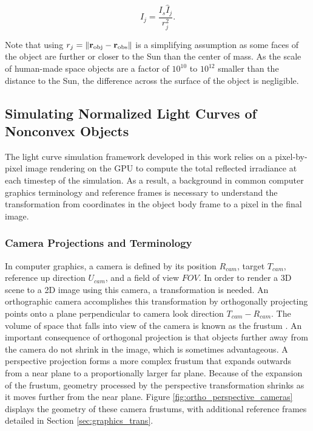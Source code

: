 \begin{equation} \label{eq:lc_func_norm_to_irrad}
  I_{j} = \frac{I_s \hat{I}_j}{r_j^2}.
\end{equation}

Note that using $r_j = \| \mathbf{r}_\mathrm{obj} - \mathbf{r}_\mathrm{obs} \|$ is a simplifying assumption as some faces of the object are further or closer to the Sun than the center of mass. As the scale of human-made space objects are a factor of $10^{10}$ to $10^{12}$ smaller than the distance to the Sun, the difference across the surface of the object is negligible.

\subsection{Simulating Normalized Light Curves of Nonconvex Objects}

The light curve simulation framework developed in this work relies on a pixel-by-pixel image rendering on the GPU to compute the total reflected irradiance at each timestep of the simulation. As a result, a background in common computer graphics terminology and reference frames is necessary to understand the transformation from coordinates in the object body frame to a pixel in the final image.

\subsubsection{Camera Projections and Terminology}

In computer graphics, a camera is defined by its position $R_{cam}$, target $T_{cam}$, reference up direction $U_{cam}$, and a field of view $FOV$. In order to render a 3D scene to a 2D image using this camera, a transformation is needed. An orthographic camera accomplishes this transformation by orthogonally projecting points onto a plane perpendicular to camera look direction $T_{cam} - R_{cam}$. The volume of space that falls into view of the camera is known as the frustum \cite{shirley2009}. An important consequence of orthogonal projection is that objects further away from the camera do not shrink in the image, which is sometimes advantageous. A perspective projection forms a more complex frustum that expands outwards from a near plane to a proportionally larger far plane. Because of the expansion of the frustum, geometry processed by the perspective transformation shrinks as it moves further from the near plane. Figure \ref{fig:ortho_perspective_cameras} displays the geometry of these camera frustums, with additional reference frames detailed in Section \ref{sec:graphics_trans}.

